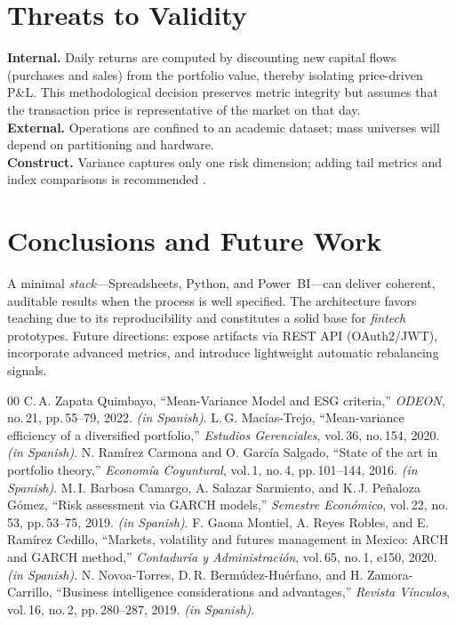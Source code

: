 \documentclass[conference]{IEEEtran}
\begin{document}
\section{Threats to Validity}
\textbf{Internal.} Daily returns are computed by discounting new capital flows (purchases and sales) from the portfolio value, thereby isolating price-driven P\&L. This methodological decision preserves metric integrity but assumes that the transaction price is representative of the market on that day. \\
\textbf{External.} Operations are confined to an academic dataset; mass universes will depend on partitioning and hardware. \\
\textbf{Construct.} Variance captures only one risk dimension; adding tail metrics and index comparisons is recommended \cite{macias2020,ramirez2016}.

\section{Conclusions and Future Work}
A minimal \emph{stack}---Spreadsheets, Python, and Power~BI---can deliver coherent, auditable results when the process is well specified. The architecture favors teaching due to its reproducibility and constitutes a solid base for \emph{fintech} prototypes. Future directions: expose artifacts via REST API (OAuth2/JWT), incorporate advanced metrics, and introduce lightweight automatic rebalancing signals.


\begin{thebibliography}{00}
C.\,A. Zapata Quimbayo, ``Mean-Variance Model and ESG criteria,'' \emph{ODEON}, no.\,21, pp.\,55--79, 2022. \emph{(in Spanish)}.
L.\,G. Macías-Trejo, ``Mean-variance efficiency of a diversified portfolio,'' \emph{Estudios Gerenciales}, vol.\,36, no.\,154, 2020. \emph{(in Spanish)}.
N. Ramírez Carmona and O. García Salgado, ``State of the art in portfolio theory,'' \emph{Economía Coyuntural}, vol.\,1, no.\,4, pp.\,101--144, 2016. \emph{(in Spanish)}.
M.\,I. Barbosa Camargo, A. Salazar Sarmiento, and K.\,J. Peñaloza Gómez, ``Risk assessment via GARCH models,'' \emph{Semestre Económico}, vol.\,22, no.\,53, pp.\,53--75, 2019. \emph{(in Spanish)}.
F. Gaona Montiel, A. Reyes Robles, and E. Ramírez Cedillo, ``Markets, volatility and futures management in Mexico: ARCH and GARCH method,'' \emph{Contaduría y Administración}, vol.\,65, no.\,1, e150, 2020. \emph{(in Spanish)}.
N. Novoa-Torres, D.\,R. Bermúdez-Huérfano, and H. Zamora-Carrillo, ``Business intelligence considerations and advantages,'' \emph{Revista Vínculos}, vol.\,16, no.\,2, pp.\,280--287, 2019. \emph{(in Spanish)}.
\end{thebibliography}
\end{document}
